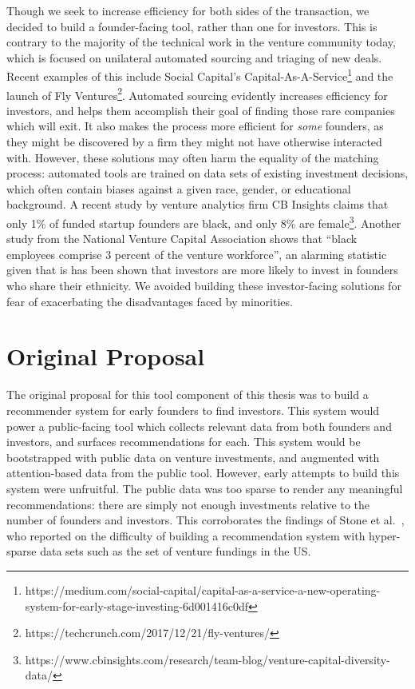 Though we seek to increase efficiency for both sides of the transaction, we decided to build a founder-facing tool, rather than one for investors. This is contrary to the majority of the technical work in the venture community today, which is focused on unilateral automated sourcing and triaging of new deals. Recent examples of this include Social Capital's Capital-As-A-Service\footnote{https://medium.com/social-capital/capital-as-a-service-a-new-operating-system-for-early-stage-investing-6d001416c0df} and the launch of Fly Ventures\footnote{https://techcrunch.com/2017/12/21/fly-ventures/}. Automated sourcing evidently increases efficiency for investors, and helps them accomplish their goal of finding those rare companies which will exit. It also makes the process more efficient for \textit{some} founders, as they might be discovered by a firm they might not have otherwise interacted with. However, these solutions may often harm the equality of the matching process: automated tools are trained on data sets of existing investment decisions, which often contain biases against a given race, gender, or educational background. A recent study by venture analytics firm CB Insights claims that only 1\% of funded startup founders are black, and only 8\% are female\footnote{https://www.cbinsights.com/research/team-blog/venture-capital-diversity-data/}. Another study from the National Venture Capital Association shows that ``black employees comprise 3 percent of the venture workforce''\cite{nvca-diversity}, an alarming statistic given that is has been shown that investors are more likely to invest in founders who share their ethnicity\cite{BENGTSSON2015338}. We avoided building these investor-facing solutions for fear of exacerbating the disadvantages faced by minorities.

\section{Original Proposal}

The original proposal for this tool component of this thesis was to build a recommender system for early founders to find investors. This system would power a public-facing tool which collects relevant data from both founders and investors, and surfaces recommendations for each. This system would be bootstrapped with public data on venture investments, and augmented with attention-based data from the public tool. However, early attempts to build this system were unfruitful. The public data was too sparse to render any meaningful recommendations: there are simply not enough investments relative to the number of founders and investors. This corroborates the findings of Stone et al.~\cite{Stone:2013:EST:2541167.2507882}, who reported on the difficulty of building a recommendation system with hyper-sparse data sets such as the set of venture fundings in the US.

